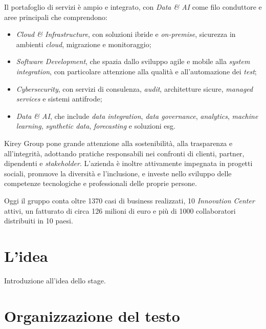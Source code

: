 Il portafoglio di servizi è ampio e integrato, con \emph{Data \& AI} come filo conduttore e aree principali che comprendono:

\begin{itemize}
    \item \emph{Cloud \& Infrastructure}, con soluzioni ibride e \emph{on-premise}, sicurezza in ambienti \emph{cloud}, migrazione e monitoraggio;
    \item \emph{Software Development}, che spazia dallo sviluppo agile e mobile alla \emph{system integration}, con particolare attenzione alla qualità e all'automazione dei \emph{test};
    \item \emph{Cybersecurity}, con servizi di consulenza, \emph{audit}, architetture sicure, \emph{managed services} e sistemi antifrode;
    \item \emph{Data \& AI}, che include \emph{data integration}, \emph{data governance}, \emph{analytics}, \emph{machine learning}, \emph{synthetic data}, \emph{forecasting} e soluzioni \gls{esg}.
\end{itemize}

Kirey Group pone grande attenzione alla sostenibilità, alla trasparenza e all'integrità, adottando pratiche responsabili nei confronti di clienti, partner, dipendenti e \emph{stakeholder}. 
L'azienda è inoltre attivamente impegnata in progetti sociali, promuove la diversità e l'inclusione, e investe nello sviluppo delle competenze tecnologiche e professionali delle proprie persone.

Oggi il gruppo conta oltre 1370 casi di business realizzati, 10 \emph{Innovation Center} attivi, un fatturato di circa 126 milioni di euro e più di 1000 collaboratori distribuiti in 10 paesi.


\section{L'idea}

Introduzione all'idea dello stage.

\section{Organizzazione del testo}

